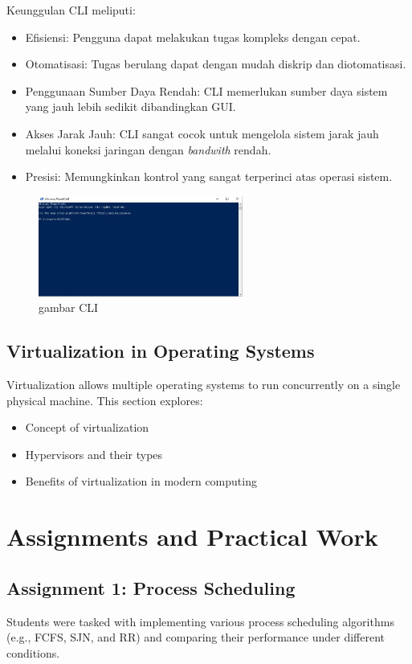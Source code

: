 \documentclass[12pt]{article}
\begin{document}
		Keunggulan CLI meliputi:
		\begin{itemize}
			\item Efisiensi: Pengguna dapat melakukan tugas kompleks dengan cepat.
			\item Otomatisasi: Tugas berulang dapat dengan mudah diskrip dan diotomatisasi.
			\item Penggunaan Sumber Daya Rendah: CLI memerlukan sumber daya sistem yang jauh lebih sedikit dibandingkan GUI.
			\item Akses Jarak Jauh: CLI sangat cocok untuk mengelola sistem jarak jauh melalui koneksi jaringan dengan \textit{bandwith} rendah.
			\item Presisi: Memungkinkan kontrol yang sangat terperinci atas operasi sistem. \cite{Greenberg2017}
		\end{itemize}

            \begin{figure}[h]
                \centering
                \includegraphics[width=0.6\textwidth]{asset/CLI.JPG}
                \caption{gambar CLI}
            \end{figure}

\subsection{Virtualization in Operating Systems}
Virtualization allows multiple operating systems to run concurrently on a single physical machine. This section explores:
\begin{itemize}
    \item Concept of virtualization
    \item Hypervisors and their types
    \item Benefits of virtualization in modern computing
\end{itemize}

\section{Assignments and Practical Work}
\subsection{Assignment 1: Process Scheduling}
Students were tasked with implementing various process scheduling algorithms (e.g., FCFS, SJN, and RR) and comparing their performance under different conditions.
\end{document}
